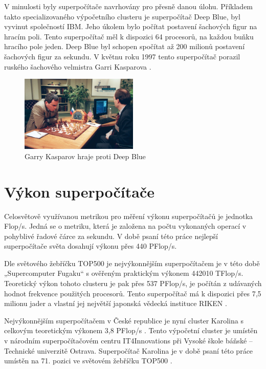 V minulosti byly superpočítače navrhovány pro přesně danou úlohu. Příkladem takto specializovaného výpočetního clusteru je superpočítač Deep Blue, byl vyvinut společností IBM. Jeho úkolem bylo počítat postavení šachových figur na hracím poli. Tento superpočítač měl k dispozici 64 procesorů, na každou buňku hracího pole jeden. Deep Blue byl schopen spočítat až 200 milionů postavení šachových figur za sekundu. V květnu roku 1997 tento superpočítač porazil ruského šachového velmistra Garri Kasparova \cite{Hosch20191128}.

\begin{figure}[h]
	\centering
	\includegraphics[width=0.5\textwidth]{Figures/Garry-Kasparov-playing-against-Deep-Blue.jpeg}
	\caption{Garry Kasparov hraje proti Deep Blue \cite{Hosch20191128}}
	\label{fig:garry-kasparov}
\end{figure}

\section{Výkon superpočítače}
Celosvětově využívanou metrikou pro měření výkonu superpočítačů je jednotka Flop/s. Jedná se o metriku, která je založena na počtu vykonaných operací v pohyblivé řadové čárce za sekundu. V době psaní této práce nejlepší superpočítače světa dosahují výkonu přes 440 PFlop/s.

Dle světového žebříčku TOP500 je nejvýkonnějším superpočítačem je v této době 
„Supercomputer Fugaku“ s ověřeným praktickým výkonem 442010 TFlop/s. Teoretický výkon tohoto clusteru je pak přes 537 PFlop/s, je počítán z udávaných hodnot frekvence použitých procesorů. Tento superpočítač má k dispozici přes 7,5 milionu jader a vlastní jej největší japonská vědecká instituce RIKEN \cite{B2TvJy8L3mSIxfWp}.

Nejvýkonnějším superpočítačem v České republice je nyní cluster Karolina s celkovým teoretickým výkonem 3,8 PFlop/s \cite{oviOzaWRPKlKSq7K}. Tento výpočetní cluster je umístěn v národním superpočítačovém centru IT4Innovations při Vysoké škole báňské – Technické univerzitě Ostrava. Superpočítač Karolina je v době psaní této práce umístěn na 71. pozici ve světovém žebříčku TOP500 \cite{iqgLoV1cXM0Qb6t1}.


